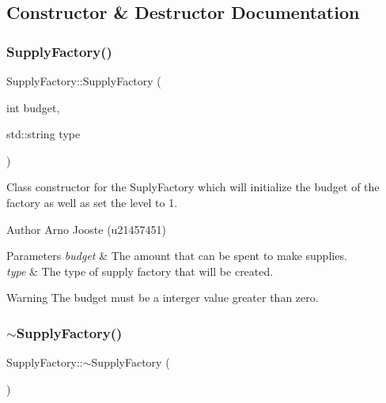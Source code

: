 \subsection{Constructor \& Destructor Documentation}
\mbox{\label{class_supply_factory_a3ba27cc94d78eadf7b832f93dce23263}} 
\subsubsection{\texorpdfstring{SupplyFactory()}{SupplyFactory()}}
{\footnotesize\ttfamily Supply\+Factory\+::\+Supply\+Factory (\begin{DoxyParamCaption}\item[{int}]{budget,  }\item[{std\+::string}]{type }\end{DoxyParamCaption})}



Class constructor for the Suply\+Factory which will initialize the budget of the factory as well as set the level to 1. 

\begin{DoxyAuthor}{Author}
Arno Jooste (u21457451) 
\end{DoxyAuthor}

\begin{DoxyParams}{Parameters}
{\em budget} & The amount that can be spent to make supplies. \\
\hline
{\em type} & The type of supply factory that will be created. \\
\hline
\end{DoxyParams}
\begin{DoxyWarning}{Warning}
The budget must be a interger value greater than zero. 
\end{DoxyWarning}
\mbox{\label{class_supply_factory_a04ca5073b6c72efcde47ddc300c2cf47}} 
\subsubsection{\texorpdfstring{$\sim$SupplyFactory()}{~SupplyFactory()}}
{\footnotesize\ttfamily Supply\+Factory\+::$\sim$\+Supply\+Factory (\begin{DoxyParamCaption}{ }\end{DoxyParamCaption})\hspace{0.3cm}{\ttfamily [virtual]}}



